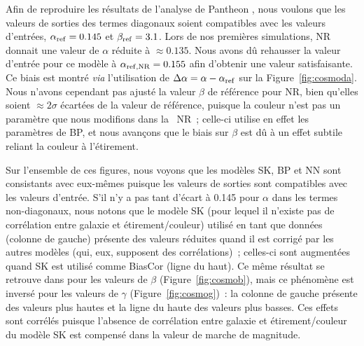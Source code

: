 \documentclass[../main/main.tex]{subfiles}
\begin{document}
Afin de reproduire les résultats de l'analyse de Pantheon \citep{scolnic2018},
nous voulons que les valeurs de sorties des termes diagonaux soient compatibles
avec les valeurs d'entrées, $\alpha_{\rm ref} = \num{0.145}$ et $\beta_{\rm ref}
= \num{3.1}$. Lors de nos premières simulations, NR donnait une valeur de
$\alpha$ réduite à $\approx \num{0.135}$. Nous avons dû rehausser la valeur
d'entrée pour ce modèle à $\alpha_{\rm ref, NR} = \num{0.155}$ afin d'obtenir
une valeur satisfaisante. Ce biais est montré \textit{via} l'utilisation de
$\Delta\alpha = \alpha - \alpha_{\rm ref}$ sur la Figure~\ref{fig:cosmoda}. Nous
n'avons cependant pas ajusté la valeur $\beta$ de référence pour NR, bien
qu'elles soient $\approx 2\sigma$ écartées de la valeur de référence, puisque la
couleur n'est pas un paramètre que nous modifions dans la \hostlib\ NR~;
celle-ci utilise en effet les paramètres de BP, et nous avançons que le biais
sur $\beta$ est dû à un effet subtile reliant la couleur à l'étirement.


Sur l'ensemble de ces figures, nous voyons que les modèles SK, BP et NN sont
consistants avec eux-mêmes puisque les valeurs de sorties sont compatibles avec
les valeurs d'entrée. S'il n'y a pas tant d'écart à \num{0.145} pour $\alpha$
dans les termes non-diagonaux, nous notons que le modèle SK (pour lequel il
n'existe pas de corrélation entre galaxie et étirement/couleur) utilisé en tant
que données (colonne de gauche) présente des valeurs réduites quand il est
corrigé par les autres modèles (qui, eux, supposent des corrélations)~; 
celles-ci sont augmentées quand SK est utilisé comme BiasCor (ligne du haut). Ce
même résultat se retrouve dans pour les valeurs de $\beta$
(Figure~\ref{fig:cosmob}), mais ce phénomène est inversé pour les valeurs de
$\gamma$ (Figure~\ref{fig:cosmog})~: la colonne de gauche présente des valeurs
plus hautes et la ligne du haute des valeurs plus basses. Ces effets sont
corrélés puisque l'absence de corrélation entre galaxie et étirement/couleur du
modèle SK est compensé dans la valeur de marche de magnitude.

\end{document}
